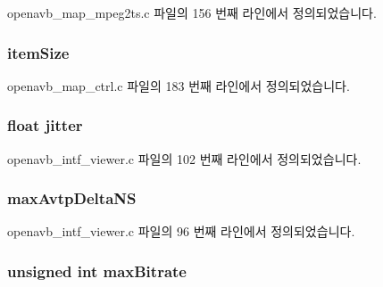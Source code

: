 openavb\+\_\+map\+\_\+mpeg2ts.\+c 파일의 156 번째 라인에서 정의되었습니다.

\subsubsection[{\texorpdfstring{item\+Size}{itemSize}}]{ item\+Size}\hypertarget{structpvt__data__t_a91e248b2730fbe7951ac5d9d3aae1752}{}\label{structpvt__data__t_a91e248b2730fbe7951ac5d9d3aae1752}


openavb\+\_\+map\+\_\+ctrl.\+c 파일의 183 번째 라인에서 정의되었습니다.

\subsubsection[{\texorpdfstring{jitter}{jitter}}]{\setlength{\rightskip}{0pt plus 5cm}float jitter}\hypertarget{structpvt__data__t_acf265c88e5bafc1c361f41ea3f6643c5}{}\label{structpvt__data__t_acf265c88e5bafc1c361f41ea3f6643c5}


openavb\+\_\+intf\+\_\+viewer.\+c 파일의 102 번째 라인에서 정의되었습니다.

\subsubsection[{\texorpdfstring{max\+Avtp\+Delta\+NS}{maxAvtpDeltaNS}}]{ max\+Avtp\+Delta\+NS}\hypertarget{structpvt__data__t_ababc603fcc7dbb1971635e7f58425585}{}\label{structpvt__data__t_ababc603fcc7dbb1971635e7f58425585}


openavb\+\_\+intf\+\_\+viewer.\+c 파일의 96 번째 라인에서 정의되었습니다.

\subsubsection[{\texorpdfstring{max\+Bitrate}{maxBitrate}}]{\setlength{\rightskip}{0pt plus 5cm}unsigned int max\+Bitrate}\hypertarget{structpvt__data__t_a8accc418990c1c1c9eafd020a474e026}{}\label{structpvt__data__t_a8accc418990c1c1c9eafd020a474e026}


